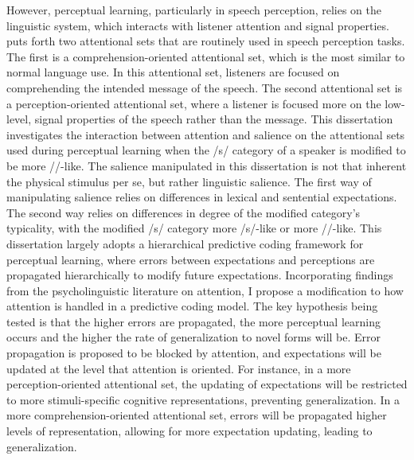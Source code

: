 
However, perceptual learning, particularly in speech perception, relies on the linguistic system, which interacts with listener attention and signal properties.
\citet{Cutler1987} puts forth two attentional sets that are routinely used in speech perception tasks. 
The first is a comprehension-oriented attentional set, which is the most similar to normal language use.  
In this attentional set, listeners are focused on comprehending the intended message of the speech.  
The second attentional set is a perception-oriented attentional set, where a listener is focused more on the low-level, signal properties of the speech rather than the message.
This dissertation investigates the interaction between attention and salience on the attentional sets used during perceptual learning when the /s/ category of a speaker is modified to be more /\textesh/-like.
The salience manipulated in this dissertation is not that inherent the physical stimulus per se, but rather linguistic salience.
The first way of manipulating salience relies on differences in lexical and sentential expectations.
The second way relies on differences in degree of the modified category's typicality, with the modified /s/ category more /s/-like or more /\textesh/-like.
This dissertation largely adopts a hierarchical predictive coding framework \citep{Clark2013} for perceptual learning, where errors between expectations and perceptions are propagated hierarchically to modify future expectations.
Incorporating findings from the psycholinguistic literature on attention, I propose a modification to how attention is handled in a predictive coding model.
The key hypothesis being tested is that the higher errors are propagated, the more perceptual learning occurs and the higher the rate of generalization to novel forms will be.
Error propagation is proposed to be blocked by attention, and expectations will be updated at the level that attention is oriented.
For instance, in a more perception-oriented attentional set, the updating of expectations will be restricted to more stimuli-specific cognitive representations, preventing generalization.
In a more comprehension-oriented attentional set, errors will be propagated higher levels of representation, allowing for more expectation updating, leading to generalization.


